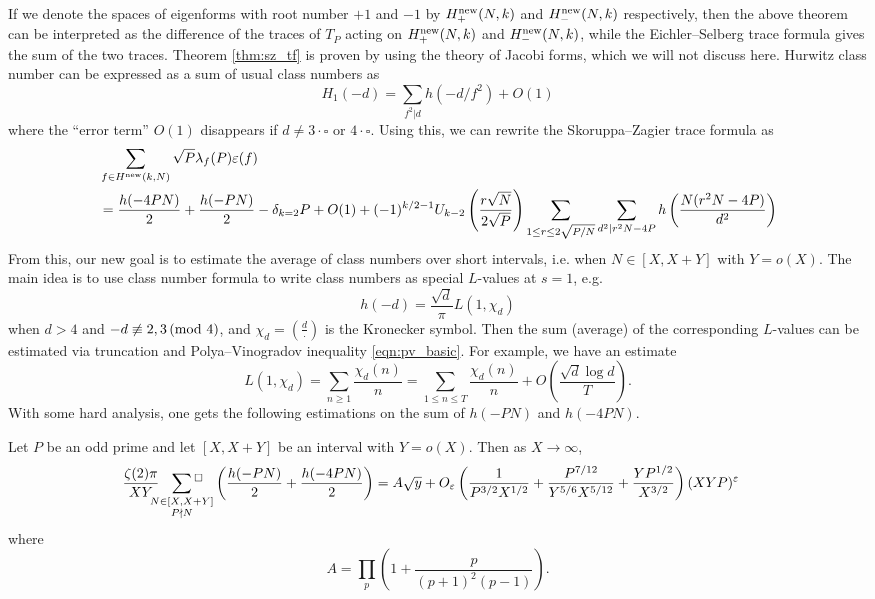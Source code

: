 If we denote the spaces of eigenforms with root number $+1$ and $-1$ by $H^{\mathrm{new}}_+(N, k)$ and $H^{\mathrm{new}}_-(N, k)$ respectively, then the above theorem can be interpreted as the difference of the traces of $T_P$ acting on $H^{\mathrm{new}}_+(N, k)$ and $H^{\mathrm{new}}_-(N, k)$, while the Eichler--Selberg trace formula gives the sum of the two traces.
Theorem \ref{thm:sz_tf} is proven by using the theory of Jacobi forms, which we will not discuss here.
Hurwitz class number can be expressed as a sum of usual class numbers as
\[
H_1(-d) = \sum_{f^2 | d} h(-d / f^2) + O(1)
\]
where the ``error term'' $O(1)$ disappears if $d \ne 3 \cdot \square$ or $4 \cdot \square$.
Using this, we can rewrite the Skoruppa--Zagier trace formula as
\begin{align*}
    &\sum_{f \in H^{\mathrm{new}}(k, N)} \sqrt{P} \lambda_f(P) \varepsilon(f) \\
    &= \frac{h(-4PN)}{2} + \frac{h(-PN)}{2} - \delta_{k=2} P + O(1) + (-1)^{k/2 - 1} U_{k-2} \left(\frac{r\sqrt{N}}{2\sqrt{P}}\right) \sum_{1 \le r \le 2\sqrt{P/N}} \sum_{d^2 | r^2 N - 4P} h\left(\frac{N(r^2 N - 4P)}{d^2}\right)
\end{align*}
From this, our new goal is to estimate the average of class numbers over short intervals, i.e. when $N \in [X, X + Y]$ with $Y = o(X)$.
The main idea is to use class number formula to write class numbers as special $L$-values at $s = 1$, e.g.
\[
h(-d) = \frac{\sqrt{d}}{\pi} L(1, \chi_d)
\]
when $d > 4$ and $-d \not\equiv 2,3 \,(\text{mod }4)$, and $\chi_d = \left(\frac{d}{\cdot}\right)$ is the Kronecker symbol.
Then the sum (average) of the corresponding $L$-values can be estimated via truncation and Polya--Vinogradov inequality \eqref{eqn:pv_basic}.
For example, we have an estimate
\[
L(1, \chi_d) = \sum_{n \ge 1} \frac{\chi_d(n)}{n} = \sum_{1 \le n \le T} \frac{\chi_d(n)}{n} + O\left(\frac{\sqrt{d} \log d}{T}\right).
\]
With some hard analysis, one gets the following estimations on the sum of $h(-PN)$ and $h(-4PN)$.
\begin{proposition}
    Let $P$ be an odd prime and let $[X, X + Y]$ be an interval with $Y = o(X)$.
    Then as $X \to \infty$,
    \begin{align*}
        &\frac{\zeta(2) \pi}{XY} \sideset{}{{}^\square}\sum_{\substack{N \in [X, X + Y] \\ P \nmid N}}  \left(\frac{h(-PN)}{2} + \frac{h(-4PN)}{2} \right) = A \sqrt{y} + O_{\varepsilon} \left(\frac{1}{P^{3/2}X^{1/2}} + \frac{P^{7/12}}{Y^{5/6} X^{5/12}} + \frac{YP^{1/2}}{X^{3/2}}\right) (XYP)^{\varepsilon}
    \end{align*}
    where
    \[
    A = \prod_p \left(1 + \frac{p}{(p + 1)^2 (p - 1)}\right).
    \]
\end{proposition}

